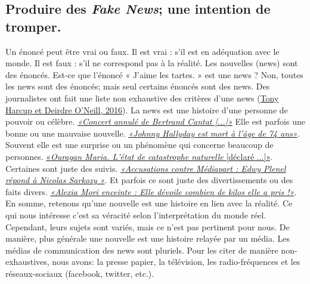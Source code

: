 \documentclass[11pt,a4paper,oldfontcommands]{memoir}
\begin{document}
\subsection{Produire des \textit{Fake News}; une intention de tromper.}
Un énoncé peut être vrai ou faux.
Il est vrai : s'il est en adéquation avec le monde.
Il est faux : s'il ne correspond pas à la réalité.
Les nouvelles (news) sont des énoncés.
Est-ce que l'énoncé « J'aime les tartes. »  est une news ?
Non, toutes les news sont des énoncés; mais seul certains énoncés sont des news. Des journalistes ont fait une liste non exhaustive des critères d'une news (\href{http://www.tandfonline.com/doi/full/10.1080/1461670X.2016.1150193}{Tony Harcup et Deirdre O’Neill, 2016}).
La news est une histoire d'une personne de pouvoir ou célèbre.
\textit{\href{https://www.francebleu.fr/infos/medias-people/le-chanteur-johnny-hallyday-est-mort-1512527631}{«Concert annulé de Bertrand Cantat [...]»}}
Elle est parfois une bonne ou une mauvaise nouvelle.
\textit{\href{https://www.voici.fr/news-people/actu-people/concert-annule-de-bertrand-cantat-des-associations-comptaient-manifester-dans-lolympia-646342}{«Johnny Hallyday est mort à l'âge de 74 ans»}}.
Souvent elle est une surprise ou un phénomène qui concerne beaucoup de personnes.
\href{}{«\textit{Ouragan Maria. L’état de catastrophe naturelle} [déclaré ...]»}.
Certaines sont juste des suivis.
\textit{\href{https://blogs.mediapart.fr/rachid-barbouch/blog/230318/accusations-contre-mediapart-edwy-plenel-repond-nicolas-sarkozy}{«Accusations contre Médiapart : Edwy Plenel répond à Nicolas Sarkozy »}}.
Et parfois ce sont juste des divertissements ou des faits divers.
\textit{\href{http://www.purepeople.com/article/alexia-mori-enceinte-elle-devoile-combien-de-kilos-elle-a-pris_a284197/1}{«Alexia Mori enceinte : Elle dévoile combien de kilos elle a pris !»}}.
En somme, retenons qu'une nouvelle est une histoire en lien avec la réalité.
Ce qui nous intéresse c'est sa véracité selon l'interprétation du monde réel.
Cependant, leurs sujets sont variés, mais ce n'est pas pertinent pour nous.
De manière, plus générale une nouvelle est une histoire relayée par un média.
Les médias de communication des news sont pluriels.
Pour les citer de manière non-exhaustives, nous avons: la presse papier, la télévision, les radio-fréquences et les réseaux-sociaux (facebook, twitter, etc.).
\end{document}
